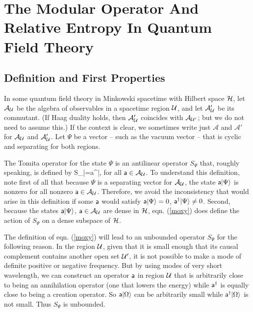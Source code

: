 \documentclass[12pt]{article}
\def\a{{\sf a}}
\def\ra{\rangle}
\numberwithin{equation}{section}
\def\A{{\mathcal A}}
\begin{document}
\section{The Modular Operator And Relative Entropy In Quantum Field Theory}\label{relmood}

\subsection{Definition and First Properties}\label{defop}

In some quantum field theory in Minkowski spacetime with Hilbert space ${\mathcal H}$, let  $\A_\U$ be the algebra of
observables in a spacetime region ${\mathcal U}$, and let $\A_\U'$ be its commutant.  (If Haag duality holds, then $\A'_\U$ coincides
with $\A_{\U'}$; but we do not need to assume this.)  If the context is clear, we sometimes write
just $\A$ and $\A'$ for $\A_\U$ and $\A'_\U$.
   Let $\Psi$ be a vector -- such as the vacuum vector -- that is cyclic and separating for both regions.  
   
The Tomita operator for the state $\Psi$ is an antilinear operator $S_\Psi$ that, roughly speaking,
is defined by
\be\label{moxy} S_\Psi \a|\Psi\ra =\a^\dagger|\Psi\ra,\ee
for all $ \a\in \A_\U$.
To understand this definition, note first of all that because $\Psi$ is a separating vector for $\A_\U$,  the state $\a|\Psi\ra$
is nonzero for all nonzero $\a\in\A_\U$.  Therefore, we avoid the inconsistency that would arise in this definition
if some $\a$ would satisfy
$\a|\Psi\ra=0$, $\a^\dagger|\Psi\ra\not=0$.    Second, because the states $\a|\Psi\ra$, $\a\in\A_\U$ are dense in ${\mathcal H}$, eqn. (\ref{moxy})
does define the action of $S_\Psi$ on a dense subspace of ${\mathcal H}$.

The definition of eqn. (\ref{moxy}) will lead to an unbounded operator $S_\Psi$ for the following reason.   In the region ${\mathcal U}$,
given that it is small enough that its causal complement contains another open set ${\mathcal U}'$, it is not possible to make a mode
of definite positive or negative frequency.  But by using modes of very short wavelength, we can construct an operator $\a$
in region ${\mathcal U}$ that is arbitrarily close to being an annihilation operator (one that lowers the energy) while $\a^\dagger$ is equally
 close
to being a creation operator.  So $\a|\Omega\rangle$ can be arbitrarily small while $\a^\dagger|\Omega\ra$ is not small.
Thus $S_\Psi$ is unbounded.
\end{document}
